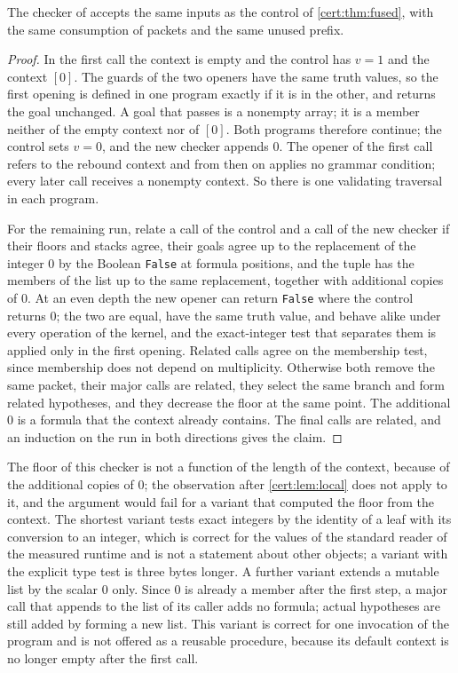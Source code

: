 \begin{theorem}\label{cert:thm:context-phase}
The checker of  accepts the same inputs as the control of
\cref{cert:thm:fused}, with the same consumption of packets and the same
unused prefix.
\end{theorem}
\begin{proof}
In the first call the context is empty and the control has $v=1$ and the
context $[0]$. The guards of the two openers have the same truth values, so
the first opening is defined in one program exactly if it is in the other, and
returns the goal unchanged. A goal that passes is a nonempty array; it is a
member neither of the empty context nor of $[0]$. Both programs therefore
continue; the control sets $v=0$, and the new checker appends $0$. The opener
of the first call refers to the rebound context and from then on applies no
grammar condition; every later call receives a nonempty context. So there is
one validating traversal in each program.

For the remaining run, relate a call of the control and a call of the new
checker if their floors and stacks agree, their goals agree up to the
replacement of the integer $0$ by the Boolean \texttt{False} at
formula positions, and the tuple has the members of the list up to the same
replacement, together with additional copies of $0$. At an even depth the new
opener can return \texttt{False} where the control returns $0$; the two are
equal, have the same truth value, and behave alike under every operation of
the kernel, and the exact-integer test that separates them is applied only in
the first opening. Related calls agree on the membership test, since
membership does not depend on multiplicity. Otherwise both remove the same
packet, their major calls are related, they select the same branch and form
related hypotheses, and they decrease the floor at the same point. The
additional $0$ is a formula that the context already contains. The final
calls are related, and an induction on the run in both directions gives the
claim.
\end{proof}

The floor of this checker is not a function of the length of the context,
because of the additional copies of $0$; the observation after
\cref{cert:lem:local} does not apply to it, and the argument would fail for a
variant that computed the floor from the context. The shortest variant tests
exact integers by the identity of a leaf with its conversion to an integer,
which is correct for the values of the standard reader of the measured
runtime and is not a statement about other objects; a variant with the
explicit type test is three bytes longer. A further variant extends a mutable
list by the scalar $0$ only. Since $0$ is already a member after the first
step, a major call that appends to the list of its caller adds no formula;
actual hypotheses are still added by forming a new list. This variant is
correct for one invocation of the program and is not offered as a reusable
procedure, because its default context is no longer empty after the first
call.


